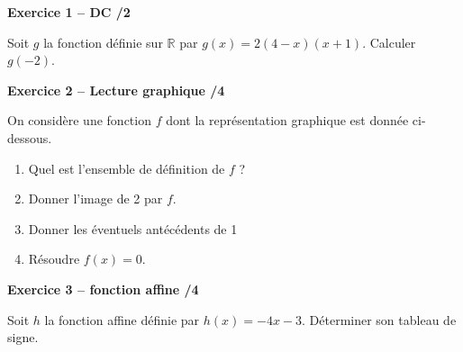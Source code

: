 \documentclass[10pt,a4paper]{article}
\begin{document}
\begin{sujets}
\textbf{Exercice 1 -- DC \hfill /2}

Soit \(g\) la fonction définie sur \(\mathbb{R}\) par \(g(x)=2(4-x)(x+1)\). Calculer \(g(-2)\).

\vspace{0.1cm}

\textbf{Exercice 2 -- Lecture graphique \hfill /4}

On considère une fonction \(f\) dont la représentation graphique est donnée ci-dessous.
\begin{enumerate}
\item Quel est l'ensemble de définition de \(f\) ?
\item Donner l'image de 2 par \(f\).
\item Donner les éventuels antécédents de 1
\item Résoudre \(f(x)=0\).
\end{enumerate}

\begin{center}
\end{center}

\textbf{Exercice 3 -- fonction affine \hfill /4}

Soit \(h\) la fonction affine définie par \(h(x)=-4x-3\). Déterminer son tableau de signe.

\end{sujets}

\newpage

\end{document}
